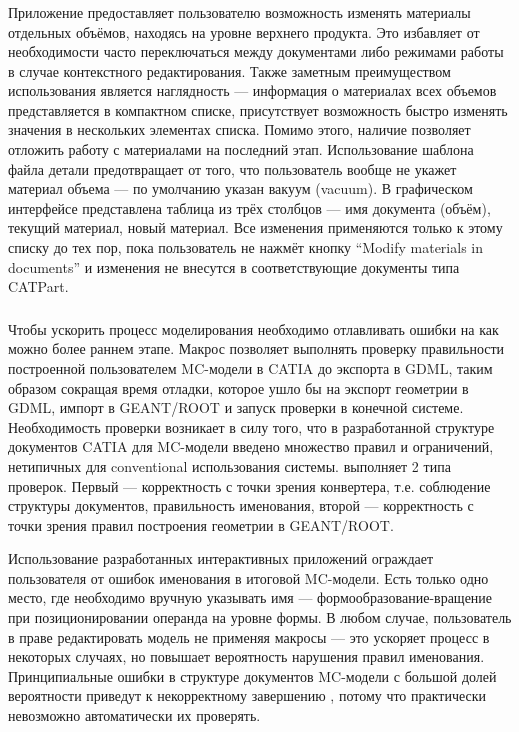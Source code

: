 \subsubsection{}\label{sec:secMacroMaterialsManager}

Приложение  предоставляет пользователю возможность изменять материалы отдельных объёмов, находясь на уровне верхнего продукта. Это избавляет от необходимости часто переключаться между документами либо режимами работы в случае контекстного редактирования. Также заметным преимуществом использования  является наглядность --- информация о материалах всех объемов представляется в компактном списке, присутствует возможность быстро изменять значения в нескольких элементах списка. Помимо этого, наличие  позволяет отложить работу с материалами на последний этап. Использование шаблона файла детали предотвращает от того, что пользователь вообще не укажет материал объема --- по умолчанию указан вакуум (vacuum). В графическом интерфейсе  представлена таблица из трёх столбцов --- имя документа (объём), текущий материал, новый материал. Все изменения применяются только к этому списку до тех пор, пока пользователь не нажмёт кнопку ``Modify materials in documents'' и изменения не внесутся в соответствующие документы типа CATPart.

\subsubsection{}\label{sec:secMacroChecker}

Чтобы ускорить процесс моделирования необходимо отлавливать ошибки на как можно более раннем этапе. Макрос  позволяет выполнять проверку правильности построенной пользователем MC-модели в CATIA до экспорта в GDML, таким образом сокращая время отладки, которое ушло бы на экспорт геометрии в GDML, импорт в GEANT/ROOT и запуск проверки в конечной системе. Необходимость проверки возникает в силу того, что в разработанной структуре документов CATIA для MC-модели введено множество правил и ограничений, нетипичных для \todo conventional использования системы.  выполняет 2 типа проверок. Первый --- корректность с точки зрения конвертера, т.е. соблюдение структуры документов, правильность именования, второй --- корректность с точки зрения правил построения геометрии в GEANT/ROOT.

Использование разработанных интерактивных приложений ограждает пользователя от ошибок именования в итоговой MC-модели. Есть только одно место, где необходимо вручную указывать имя --- формообразование-вращение при позиционировании операнда на уровне формы. В любом случае, пользователь в праве редактировать модель не применяя макросы --- это ускоряет процесс в некоторых случаях, но повышает вероятность нарушения правил именования. Принципиальные ошибки в структуре документов MC-модели с большой долей вероятности приведут к некорректному завершению , потому что практически невозможно автоматически их проверять.

